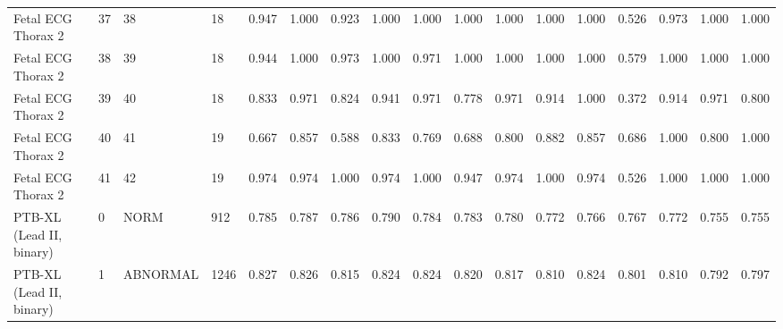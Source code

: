 \begin{longtable}{lllllllllllllllll}
Fetal ECG Thorax 2 & 37 & 38 & 18 & 0.947 & 1.000 & 0.923 & 1.000 & 1.000 & 1.000 & 1.000 & 1.000 & 1.000 & 0.526 & 0.973 & 1.000 & 1.000 \\
Fetal ECG Thorax 2 & 38 & 39 & 18 & 0.944 & 1.000 & 0.973 & 1.000 & 0.971 & 1.000 & 1.000 & 1.000 & 1.000 & 0.579 & 1.000 & 1.000 & 1.000 \\
Fetal ECG Thorax 2 & 39 & 40 & 18 & 0.833 & 0.971 & 0.824 & 0.941 & 0.971 & 0.778 & 0.971 & 0.914 & 1.000 & 0.372 & 0.914 & 0.971 & 0.800 \\
Fetal ECG Thorax 2 & 40 & 41 & 19 & 0.667 & 0.857 & 0.588 & 0.833 & 0.769 & 0.688 & 0.800 & 0.882 & 0.857 & 0.686 & 1.000 & 0.800 & 1.000 \\
Fetal ECG Thorax 2 & 41 & 42 & 19 & 0.974 & 0.974 & 1.000 & 0.974 & 1.000 & 0.947 & 0.974 & 1.000 & 0.974 & 0.526 & 1.000 & 1.000 & 1.000 \\
PTB-XL (Lead II, binary) & 0 & NORM & 912 & 0.785 & 0.787 & 0.786 & 0.790 & 0.784 & 0.783 & 0.780 & 0.772 & 0.766 & 0.767 & 0.772 & 0.755 & 0.755 \\
PTB-XL (Lead II, binary) & 1 & ABNORMAL & 1246 & 0.827 & 0.826 & 0.815 & 0.824 & 0.824 & 0.820 & 0.817 & 0.810 & 0.824 & 0.801 & 0.810 & 0.792 & 0.797 \\
\end{longtable}
